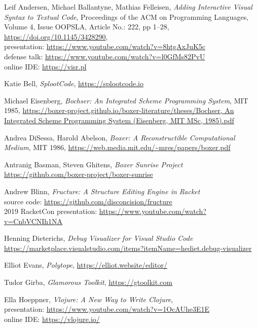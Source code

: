 \documentclass[sigconf]{acmart}
\begin{document}
\begin{thebibliography}{14}
  
  Leif Andersen, Michael Ballantyne, Mathias Felleisen,
  \emph{Adding Interactive Visual Syntax to Textual Code},
  Proceedings of the ACM on Programming Languages, Volume 4, Issue OOPSLA,
  Article No.: 222, pp 1–28, \url{https://doi.org/10.1145/3428290}, \\
  presentation: \url{https://www.youtube.com/watch?v=8htgAxJuK5c} \\ 
  defense talk: \url{https://www.youtube.com/watch?v=l0GfMs82PvU} \\
  online IDE: \url{https://visr.pl}

  Katie Bell, \emph{SplootCode}, \url{https://splootcode.io}
  
  Michael Eisenberg, \emph{Bochser: An Integrated Scheme Programming System},
  MIT 1985, \url{https://boxer-project.github.io/boxer-literature/theses/Bochser, An Integrated Scheme Programming System (Eisenberg, MIT MSc, 1985).pdf}
  
  Andrea DiSessa, Harold Abelson,
  \emph{Boxer: A Reconstructible Computational Medium},
  MIT 1986, \url{https://web.media.mit.edu/~mres/papers/boxer.pdf}

  Antranig Basman, Steven Ghitens, \emph{Boxer Sunrise Project} \\
  \url{https://github.com/boxer-project/boxer-sunrise}
  
  Andrew Blinn, \emph{Fructure: A Structure Editing Engine in Racket} \\
  source code: \url{https://github.com/disconcision/fructure} \\
  2019 RacketCon presentation: \url{https://www.youtube.com/watch?v=CnbVCNIh1NA}

  Henning Dieterichs, \emph{Debug Visualizer for Visual Studio Code} \\
  \url{https://marketplace.visualstudio.com/items?itemName=hediet.debug-visualizer}
  
  Elliot Evans, \emph{Polytope}, \url{https://elliot.website/editor/}

  Tudor Girba, \emph{Glamorous Toolkit}, \url{https://gtoolkit.com}
  
  Ella Hoeppner, \emph{Vlojure: A New Way to Write Clojure}, \\
  presentation: \url{https://www.youtube.com/watch?v=1OcAUhe3E1E} \\
  online IDE: \url{https://vlojure.io/}
  

\end{thebibliography}
\end{document}
